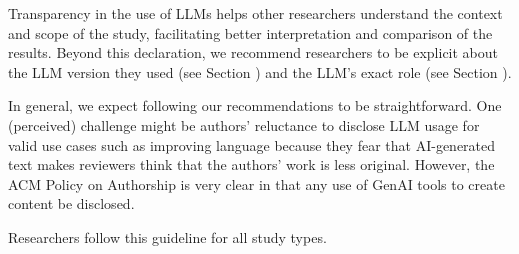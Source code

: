 Transparency in the use of LLMs helps other researchers understand the context and scope of the study, facilitating better interpretation and comparison of the results.
Beyond this declaration, we recommend researchers to be explicit about the LLM version they used (see Section \modelversion) and the LLM's exact role (see Section \toolarchitecture).


In general, we expect following our recommendations to be straightforward.
One (perceived) challenge might be authors' reluctance to disclose LLM usage for valid use cases such as improving language because they fear that AI-generated text makes reviewers think that the authors' work is less original.
However, the ACM Policy on Authorship is very clear in that any use of GenAI tools to create content \must be disclosed.


Researchers \must follow this guideline for all study types.
